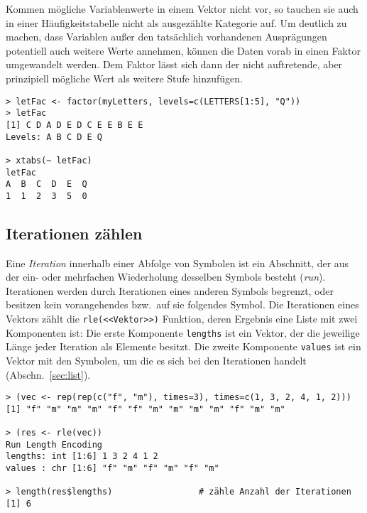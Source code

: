 Kommen mögliche Variablenwerte in einem Vektor nicht vor, so tauchen sie auch in einer Häufigkeitstabelle nicht als ausgezählte Kategorie auf. Um deutlich zu machen, dass Variablen außer den tatsächlich vorhandenen Ausprägungen potentiell auch weitere Werte annehmen, können die Daten vorab in einen Faktor umgewandelt werden. Dem Faktor lässt sich dann der nicht auftretende, aber prinzipiell mögliche Wert als weitere Stufe hinzufügen.
\begin{lstlisting}
> letFac <- factor(myLetters, levels=c(LETTERS[1:5], "Q"))
> letFac
[1] C D A D E D C E E B E E
Levels: A B C D E Q

> xtabs(~ letFac)
letFac
A  B  C  D  E  Q
1  1  2  3  5  0
\end{lstlisting}

\subsection{Iterationen zählen}
\label{sec:runs}

Eine \emph{Iteration} innerhalb einer Abfolge von Symbolen ist ein Abschnitt, der aus der ein- oder mehrfachen Wiederholung desselben Symbols besteht (\emph{run}). Iterationen werden durch Iterationen eines anderen Symbols begrenzt, oder besitzen kein vorangehendes bzw.\ auf sie folgendes Symbol. Die Iterationen eines Vektors zählt die \lstinline!rle(<<Vektor>>)! Funktion, deren Ergebnis eine Liste mit zwei Komponenten ist: Die erste Komponente \lstinline!lengths! ist ein Vektor, der die jeweilige Länge jeder Iteration als Elemente besitzt. Die zweite Komponente \lstinline!values! ist ein Vektor mit den Symbolen, um die es sich bei den Iterationen handelt (Abschn.\ \ref{sec:list}).
\begin{lstlisting}
> (vec <- rep(rep(c("f", "m"), times=3), times=c(1, 3, 2, 4, 1, 2)))
[1] "f" "m" "m" "m" "f" "f" "m" "m" "m" "m" "f" "m" "m"

> (res <- rle(vec))
Run Length Encoding
lengths: int [1:6] 1 3 2 4 1 2
values : chr [1:6] "f" "m" "f" "m" "f" "m"

> length(res$lengths)                 # zähle Anzahl der Iterationen
[1] 6
\end{lstlisting}

